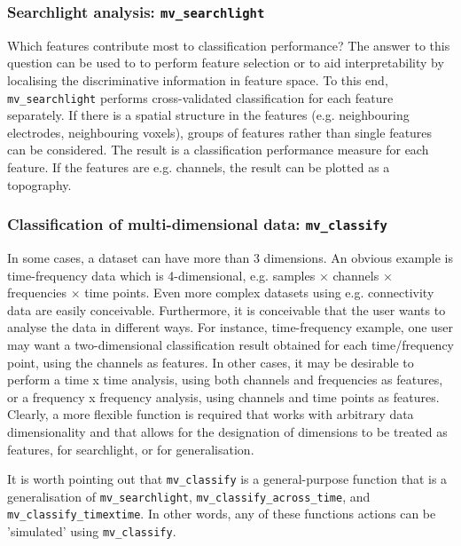 \documentclass[utf8]{frontiersSCNS} %
\newcommand{\ttt}[1]{\texttt{#1}}
\begin{document}
\subsubsection{Searchlight analysis:  \ttt{mv\_searchlight}}

Which features contribute most to classification performance? The answer to this question can be used to to perform feature selection or to aid interpretability by localising the discriminative information in feature space. To this end, \ttt{mv\_searchlight} performs cross-validated classification for each feature separately. If there is a spatial structure in the features (e.g. neighbouring electrodes, neighbouring voxels), groups of features rather than single features can be considered. The result is a classification performance measure for each feature. If the features are e.g. channels, the result can be plotted as a topography.


\subsubsection{Classification of multi-dimensional data: \ttt{mv\_classify}}

In some cases, a dataset can have more than 3 dimensions. An obvious example is time-frequency data which is 4-dimensional, e.g. samples $\times$ channels  $\times$ frequencies $\times$ time points. Even more complex datasets using e.g. connectivity data are easily conceivable. Furthermore, it is conceivable that the user wants to analyse the data in different ways. For instance, time-frequency example, one user may want a two-dimensional classification result obtained for each time/frequency point, using the channels as features. In other cases, it may be desirable to perform a time x time analysis, using both channels and frequencies as features, or a frequency x frequency analysis, using channels and time points as features. Clearly, a more flexible function is required that works with arbitrary data dimensionality and that allows for the designation of dimensions to be treated as features, for searchlight, or for generalisation.

It is worth pointing out that \texttt{mv\_classify} is a general-purpose function that is a generalisation of \texttt{mv\_searchlight}, \texttt{mv\_classify\_across\_time}, and \texttt{mv\_classify\_timextime}. In other words, any of these functions actions can be 'simulated' using \texttt{mv\_classify}.

\end{document}
